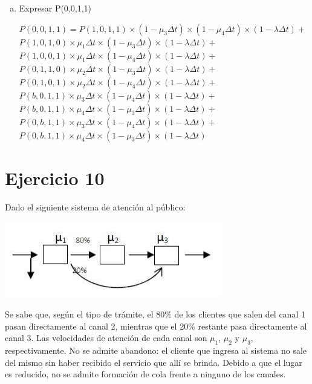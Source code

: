 \documentclass[a4paper,11pt]{article}
\begin{document}
\begin{enumerate}[a)]
  \vspace{13pt}
  \item Expresar P(0,0,1,1)

  \leftskip=6pt
  \parindent=-18pt
  $P(0,0,1,1) = P(1,0,1,1) \times (1-\mu_3\Delta t) \times (1-\mu_4\Delta t) \times (1-\lambda\Delta t) +$
  $ P(1,0,1,0) \times \mu_1\Delta t \times (1-\mu_3\Delta t) \times (1-\lambda\Delta t) +$
  $ P(1,0,0,1) \times \mu_1\Delta t \times (1-\mu_4\Delta t) \times (1-\lambda\Delta t) +$
  $ P(0,1,1,0) \times \mu_2\Delta t \times (1-\mu_3\Delta t) \times (1-\lambda\Delta t) +$
  $ P(0,1,0,1) \times \mu_2\Delta t \times (1-\mu_4\Delta t) \times (1-\lambda\Delta t) +$
  $ P(b,0,1,1) \times \mu_3\Delta t \times (1-\mu_4\Delta t) \times (1-\lambda\Delta t) +$
  $ P(b,0,1,1) \times \mu_4\Delta t \times (1-\mu_3\Delta t) \times (1-\lambda\Delta t) +$
  $ P(0,b,1,1) \times \mu_3\Delta t \times (1-\mu_4\Delta t) \times (1-\lambda\Delta t) +$
  $ P(0,b,1,1) \times \mu_4\Delta t \times (1-\mu_3\Delta t) \times (1-\lambda\Delta t)$

\end{enumerate}

\vspace{35pt}
\leftskip=0pt
\parindent=0pt
\section{\textbf{Ejercicio 10}}

Dado el siguiente sistema de atención al público:

\vspace{13pt}
\includegraphics[width=269pt, height=94pt, keepaspectratio=true]{TP1-Colas-fig009.png}

\vspace{13pt}
Se sabe que, según el tipo de trámite, el 80\% de los clientes que salen del
canal 1 pasan directamente al canal 2, mientras que el 20\% restante pasa
directamente al canal 3. Las velocidades de atención de cada canal son $\mu_1$,
$\mu_2$ y $\mu_3$, respectivamente.  No se admite abandono: el cliente que
ingresa al sistema no sale del mismo sin haber recibido el servicio que allí se
brinda.
Debido a que el lugar es reducido, no se admite formación de cola
frente a ninguno de los canales.
\end{document}
